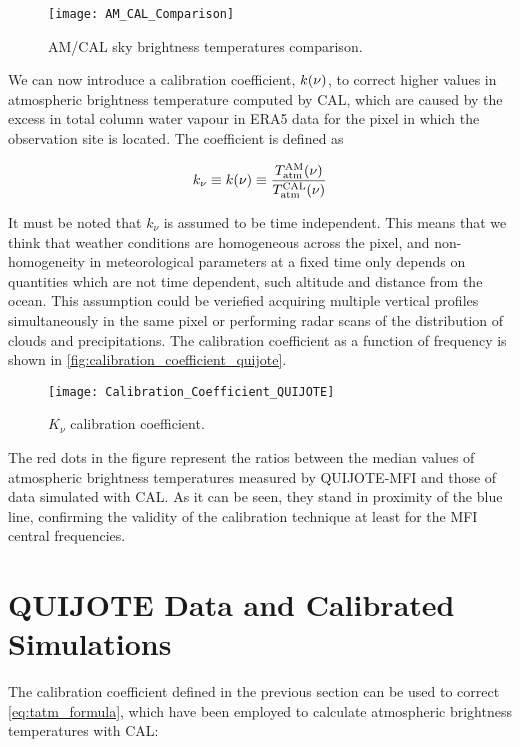 \begin{figure}
        \centering
        \texttt{[image: AM\_CAL\_Comparison]}
        \caption{AM/CAL sky brightness temperatures comparison.}
        \label{fig:am_cal_comparison}
\end{figure}

We can now introduce a calibration coefficient, $k\qty(\nu)$, to correct
higher values in atmospheric brightness temperature computed by CAL, which
are caused by the excess in total column water vapour in ERA5 data for
the pixel in which the observation site is located. The coefficient is defined as

\begin{equation}
        k_\nu \equiv  k\qty(\nu) \equiv
        \frac{T^\text{AM}_\text{atm}\qty(\nu)}{
        T^\text{CAL}_\text{atm}\qty(\nu)}
\end{equation}

It must be noted that $k_\nu$ is assumed to be time independent. This means
that we think that weather conditions are homogeneous across the pixel, and
non-homogeneity in meteorological parameters at a fixed time only depends
on quantities which are not time dependent, such altitude and distance from
the ocean. This assumption could be veriefied acquiring multiple vertical
profiles simultaneously in the same pixel or performing radar scans of the
distribution of clouds and precipitations. The calibration coefficient as a
function of frequency is shown in
\autoref{fig:calibration_coefficient_quijote}.

\begin{figure}
        \centering
        \texttt{[image: Calibration\_Coefficient\_QUIJOTE]}
        \caption{$K_\nu$ calibration coefficient.}
        \label{fig:calibration_coefficient_quijote}
\end{figure}

The red dots in the figure represent the ratios between the median values of
atmospheric brightness temperatures measured by QUIJOTE-MFI and those of data
simulated with CAL. As it can be seen, they stand in proximity of the
blue line, confirming the validity of the calibration technique at least
for the MFI central frequencies.

\section{QUIJOTE Data and Calibrated Simulations}

The calibration coefficient defined in the previous section can be used to
correct \autoref{eq:tatm_formula}, which have been employed to calculate
atmospheric brightness temperatures with CAL:


